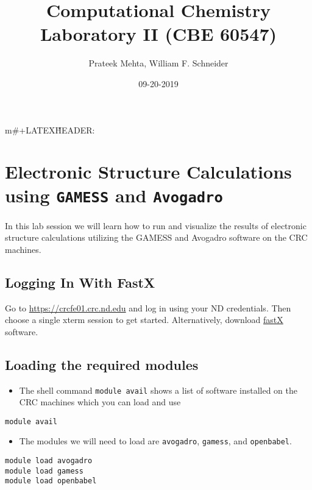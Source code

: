 \documentclass[11pt]{article}
\author{Prateek Mehta, William F. Schneider}
\date{09-20-2019}
\title{Computational Chemistry Laboratory II (CBE 60547)}
\begin{document}
m\#+LATEX\~HEADER: \usepackage{enumerate}
\maketitle

\section{Electronic Structure Calculations using \texttt{GAMESS} and \texttt{Avogadro}}
\label{sec:org867c58a}

In this lab session we will learn how to run and visualize the results of electronic structure calculations utilizing the GAMESS and Avogadro software on the CRC machines.

\subsection{Logging In With FastX}
\label{sec:org5ca6aec}
Go to \url{https://crcfe01.crc.nd.edu} and log in using your ND credentials.  Then
choose a single xterm session to get started.  Alternatively, download \href{https://www.starnet.com/fastx/current-client}{fastX} software.

\subsection{Loading the required modules}
\label{sec:org2a921d9}

\begin{itemize}
\item The shell command \texttt{module avail} shows a list of software installed on the CRC machines which you can load and use
\end{itemize}

\begin{verbatim}
module avail
\end{verbatim}


\begin{itemize}
\item The modules we will need to load are \texttt{avogadro}, \texttt{gamess}, and \texttt{openbabel}.
\end{itemize}

\begin{verbatim}
module load avogadro
module load gamess
module load openbabel
\end{verbatim}
\end{document}
